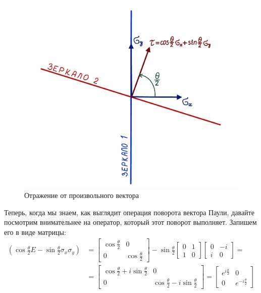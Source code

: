\begin{figure}[!ht]
\centering
\includegraphics[scale=0.27]{appendix/images/arbitrary vector.png}
\caption{Отражение от произвольного вектора}
\label{fig B.8}
\end{figure}

Теперь, когда мы знаем, как выглядит операция поворота вектора Паули, давайте посмотрим внимательнее на оператор, который этот поворот выполняет. Запишем его в виде матрицы:
\begin{align*}
\left(\cos\frac{\theta}{2}E - \sin\frac{\theta}{2}\sigma_x\sigma_y\right) &= \begin{bmatrix}\cos\frac{\theta}{2} & 0 \\ 0 & \cos\frac{\theta}{2}\end{bmatrix} - \sin\frac{\theta}{2}\begin{bmatrix}0 & 1 \\ 1 & 0\end{bmatrix}\begin{bmatrix}0 & -i \\ i & 0\end{bmatrix} = \\
&= \begin{bmatrix}\cos\frac{\theta}{2} + i\sin\frac{\theta}{2} & 0 \\ 0 & \cos\frac{\theta}{2} - i\sin\frac{\theta}{2}\end{bmatrix} = \begin{bmatrix}e^{i\frac{\theta}{2}} & 0 \\ 0 & e^{-i\frac{\theta}{2}}\end{bmatrix}
\end{align*}

